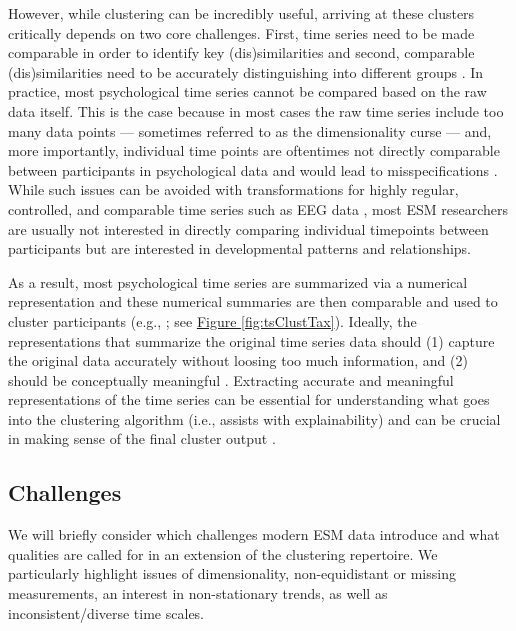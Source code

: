 \documentclass[man, 12pt, a4paper, mask, floatsintext]{apa7}
\theoremstyle{break}
\theoremstyle{plain}
\newcommand{\fgrref}[2][]{\hyperref[#2]{Figure \ref*{#2}#1}}
\begin{document}
However, while clustering can be incredibly useful, arriving at these clusters critically depends on two core challenges. First, time series need to be made comparable in order to identify key (dis)similarities and second, comparable (dis)similarities need to be accurately distinguishing into different groups \citep[e.g.,][]{Aghabozorgi2015}. In practice, most psychological time series cannot be compared based on the raw data itself. This is the case because in most cases the raw time series include too many data points --- sometimes referred to as the dimensionality curse \citep[e.g.,][]{altman2018} --- and, more importantly, individual time points are oftentimes not directly comparable between participants in psychological data and would lead to misspecifications \citep[e.g., ][]{faloutsos1994}. While such issues can be avoided with transformations for highly regular, controlled, and comparable time series such as EEG data \citep[e.g.,][]{huang1985}, most ESM researchers are usually not interested in directly comparing individual timepoints between participants but are interested in developmental patterns and relationships. 

As a result, most psychological time series are summarized via a numerical representation and these numerical summaries are then comparable and used to cluster participants (e.g., \citealp[]{timmerman2013}; see \fgrref{fig:tsClustTax}). Ideally, the representations that summarize the original time series data should (1) capture the original data accurately without loosing too much information, and (2) should be conceptually meaningful \citep[][]{vandermaaten2009}. Extracting accurate and meaningful representations of the time series can be essential for understanding what goes into the clustering algorithm (i.e., assists with explainability) and can be crucial in making sense of the final cluster output \citep[i.e., assists with interpretability; e.g.,][]{Kennedy2021}. 

\subsection{Challenges}

We will briefly consider which challenges modern ESM data introduce and what qualities are called for in an extension of the clustering repertoire. We particularly highlight issues of dimensionality, non-equidistant or missing measurements, an interest in non-stationary trends, as well as inconsistent/diverse time scales. 
\end{document}
